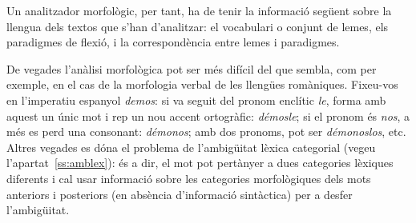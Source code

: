 Un analitzador morfològic, per tant, ha de tenir la informació següent
sobre la llengua dels textos que s'han d'analitzar: el vocabulari o
conjunt de lemes, els paradigmes de flexió, i la correspondència entre
lemes i paradigmes.

De vegades l'anàlisi morfològica pot ser més difícil del que sembla,
com per exemple, en el cas de la morfologia verbal de les llengües
romàniques. Fixeu-vos en l'imperatiu espanyol \emph{demos}: si va
seguit del pronom enclític \emph{le}, forma amb aquest un únic mot i
rep un nou accent ortogràfic: \emph{démosle}; si el pronom és
\emph{nos}, a més es perd una consonant: \emph{démonos}; amb dos
pronoms, pot ser {\em démonoslos}, etc.  Altres vegades es dóna el
problema de l'ambigüitat lèxica categorial (vegeu
l'apartat~\ref{ss:amblex}): és a dir, el mot pot pertànyer a dues
categories lèxiques diferents i cal usar informació sobre les
categories morfològiques dels mots anteriors i posteriors (en absència
d'informació sintàctica) per a desfer l'ambigüitat.

